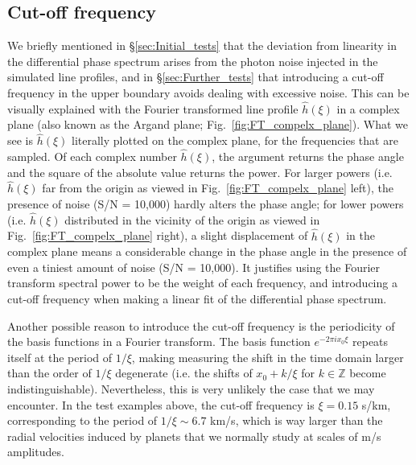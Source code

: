 \subsection{Cut-off frequency}
\label{sec:noise}

We briefly mentioned in \S\ref{sec:Initial_tests} that the deviation from linearity in the differential phase spectrum arises from the photon noise injected in the simulated line profiles, and in \S\ref{sec:Further_tests} that introducing a cut-off frequency in the upper boundary avoids dealing with excessive noise. This can be visually explained with the Fourier transformed line profile $\hat{h}(\xi)$ in a complex plane (also known as the Argand plane; Fig.~\ref{fig:FT_compelx_plane}). What we see is $\hat{h}(\xi)$ literally plotted on the complex plane, for the frequencies that are sampled. Of each complex number $\hat{h}(\xi)$, the argument returns the phase angle and the square of the absolute value returns the power. For larger powers (i.e. $\hat{h}(\xi)$ far from the origin as viewed in Fig.~\ref{fig:FT_compelx_plane} left), the presence of noise (S/N = 10,000) hardly alters the phase angle; for lower powers (i.e. $\hat{h}(\xi)$ distributed in the vicinity of the origin as viewed in Fig.~\ref{fig:FT_compelx_plane} right), a slight displacement of $\hat{h}(\xi)$ in the complex plane means a considerable change in the phase angle in the presence of even a tiniest amount of noise (S/N = 10,000). It justifies using the Fourier transform spectral power to be the weight of each frequency, and introducing a cut-off frequency when making a linear fit of the differential phase spectrum. 

Another possible reason to introduce the cut-off frequency is the periodicity of the basis functions in a Fourier transform. The basis function $e^{-2 \pi ix_0 \xi}$ repeats itself at the period of $1/\xi$, making measuring the shift in the time domain larger than the order of $1/\xi$ degenerate (i.e. the shifts of $x_0+k/\xi$ for $k\in\mathbb{Z}$ become indistinguishable). Nevertheless, this is very unlikely the case that we may encounter. In the test examples above, the cut-off frequency is $\xi = 0.15$ s/km, corresponding to the period of $1/\xi\sim6.7$ km/s, which is way larger than the radial velocities induced by planets that we normally study at scales of m/s amplitudes. 

